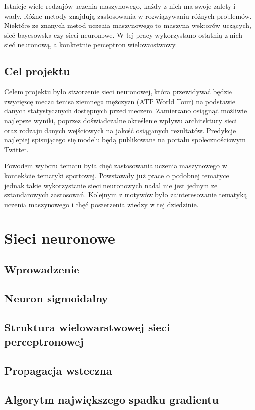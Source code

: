 Istnieje wiele rodzajów uczenia maszynowego, każdy z nich ma swoje zalety i wady. Różne metody znajdują zastosowania w rozwiązywaniu różnych problemów. Niektóre ze znanych metod uczenia maszynowego to maszyna wektorów uczących, sieć bayesowska czy sieci neuronowe. W tej pracy wykorzystano ostatnią z nich - sieć neuronową, a konkretnie perceptron wielowarstwowy.

\section{Cel projektu}
Celem projektu było stworzenie sieci neuronowej, która przewidywać będzie zwycięzcę meczu tenisa ziemnego mężczyzn (ATP World Tour) na podstawie danych statystycznych dostępnych przed meczem. Zamierzano osiągnąć możliwie najlepsze wyniki, poprzez doświadczalne określenie wpływu architektury sieci oraz rodzaju danych wejściowych na jakość osiąganych rezultatów. Predykcje najlepiej spisującego się modelu będą publikowane na portalu społecznościowym Twitter.

Powodem wyboru tematu była chęć zastosowania uczenia maszynowego w kontekście tematyki sportowej. Powstawały już prace o podobnej tematyce, jednak takie wykorzystanie sieci neuronowych nadal nie jest jednym ze sztandarowych zastosowań. Kolejnym z motywów było zainteresowanie tematyką uczenia maszynowego i chęć poszerzenia wiedzy w tej dziedzinie.


\chapter{Sieci neuronowe}
\section{Wprowadzenie}
\section{Neuron sigmoidalny}
\section{Struktura wielowarstwowej sieci perceptronowej}
\section{Propagacja wsteczna}
\section{Algorytm największego spadku gradientu}

